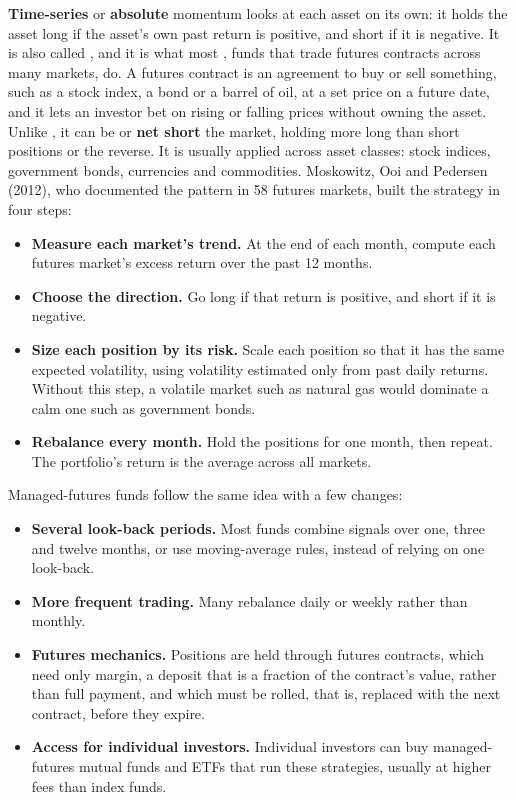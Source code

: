 \textbf{Time-series} or \textbf{absolute} momentum looks at each asset on its own: it holds the asset long if the asset's own past return is positive, and short if it is negative. It is also called , and it is what most , funds that trade futures contracts across many markets, do. A futures contract is an agreement to buy or sell something, such as a stock index, a bond or a barrel of oil, at a set price on a future date, and it lets an investor bet on rising or falling prices without owning the asset. Unlike , it can be  or \textbf{net short} the market, holding more long than short positions or the reverse. It is usually applied across asset classes: stock indices, government bonds, currencies and commodities. Moskowitz, Ooi and Pedersen (2012), who documented the pattern in 58 futures markets, built the strategy in four steps:

\begin{itemize}
  \item \textbf{Measure each market's trend.} At the end of each month, compute each futures market's excess return over the past 12 months.
  \item \textbf{Choose the direction.} Go long if that return is positive, and short if it is negative.
  \item \textbf{Size each position by its risk.} Scale each position so that it has the same expected volatility, using volatility estimated only from past daily returns. Without this step, a volatile market such as natural gas would dominate a calm one such as government bonds.
  \item \textbf{Rebalance every month.} Hold the positions for one month, then repeat. The portfolio's return is the average across all markets.
\end{itemize}

Managed-futures funds follow the same idea with a few changes:

\begin{itemize}
  \item \textbf{Several look-back periods.} Most funds combine signals over one, three and twelve months, or use moving-average rules, instead of relying on one look-back.
  \item \textbf{More frequent trading.} Many rebalance daily or weekly rather than monthly.
  \item \textbf{Futures mechanics.} Positions are held through futures contracts, which need only margin, a deposit that is a fraction of the contract's value, rather than full payment, and which must be rolled, that is, replaced with the next contract, before they expire.
  \item \textbf{Access for individual investors.} Individual investors can buy managed-futures mutual funds and ETFs that run these strategies, usually at higher fees than index funds.
\end{itemize}


